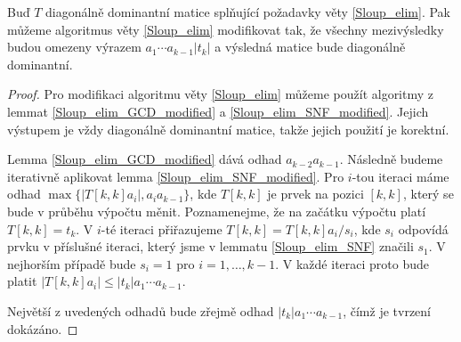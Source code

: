 \begin{lem} \label{Sloup_elim_modified}
Buď $ T $ diagonálně dominantní matice splňující požadavky věty \ref{Sloup_elim}.
Pak můžeme algoritmus věty \ref{Sloup_elim} modifikovat tak, že všechny
mezivýsledky budou omezeny výrazem $ a_1 \cdots a_{k - 1} |t_k|$ 
a výsledná matice bude diagonálně dominantní.
\end{lem}
\begin{proof}
Pro modifikaci algoritmu věty \ref{Sloup_elim} můžeme použít algoritmy z lemmat
\ref{Sloup_elim_GCD_modified} a \ref{Sloup_elim_SNF_modified}. Jejich výstupem
je vždy diagonálně dominantní matice, takže jejich použití je korektní.

Lemma \ref{Sloup_elim_GCD_modified} dává odhad $ a_{k - 2} a_{k - 1} $. 
Následně budeme iterativně aplikovat lemma \ref{Sloup_elim_SNF_modified}.
Pro $ i $-tou iteraci máme odhad $ \max\{ |T[k,k] a_i|, a_i a_{k - 1} \} $,
kde $ T[k,k] $ je prvek na pozici $ [k, k] $, který se bude v průběhu výpočtu
měnit. Poznamenejme, že na začátku výpočtu platí $ T[k,k] = t_k $. V $ i $-té 
iteraci přiřazujeme $ T[k,k] = T[k,k] a_i / s_i $, kde $ s_i $ odpovídá prvku
v příslušné iteraci, který jsme v lemmatu \ref{Sloup_elim_SNF} značili $ s_1 $.
V nejhorším případě bude $ s_i = 1 $ pro $ i = 1, \dots, k - 1 $. V každé iteraci 
proto bude platit $ |T[k,k] a_i| \leq |t_k| a_1 \cdots a_{k - 1} $. 

Největší z uvedených odhadů bude zřejmě odhad $ |t_k| a_1 \cdots a_{k - 1} $,
čímž je tvrzení dokázáno.
\end{proof}



